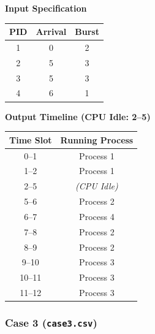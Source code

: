 \documentclass[11pt,a4paper]{article}
\begin{document}
\begin{center}
\begin{minipage}[t]{0.45\textwidth}
\centering
\textbf{Input Specification}
\vspace{0.3em}

\begin{tabular}{ccc}
\toprule
\textbf{PID} & \textbf{Arrival} & \textbf{Burst} \\
\midrule
1 & 0 & 2 \\
2 & 5 & 3 \\
3 & 5 & 3 \\
4 & 6 & 1 \\
\bottomrule
\end{tabular}
\end{minipage}
\hfill
\begin{minipage}[t]{0.45\textwidth}
\centering
\textbf{Output Timeline (CPU Idle: 2--5)}
\vspace{0.3em}

\begin{tabular}{cc}
\toprule
\textbf{Time Slot} & \textbf{Running Process} \\
\midrule
0--1   & Process 1 \\
1--2   & Process 1 \\
2--5   & \textit{(CPU Idle)} \\
5--6   & Process 2 \\
6--7   & Process 4 \\
7--8   & Process 2 \\
8--9   & Process 2 \\
9--10  & Process 3 \\
10--11 & Process 3 \\
11--12 & Process 3 \\
\bottomrule
\end{tabular}
\end{minipage}
\end{center}

\subsubsection{Case 3 (\texttt{case3.csv})}
\end{document}
